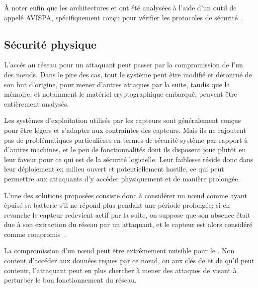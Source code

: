 À noter enfin que les architectures  et  ont été analysées à l'aide d'un outil de  appelé AVISPA, spécifiquement conçu pour vérifier les protocoles de sécurité~\cite{TCCDC09}.

    \subsection{Sécurité physique}

L'accès au réseau pour un attaquant peut passer par la compromission de l'un des nœuds.
Dans le pire des cas, tout le système peut être modifié et détourné de son but d'origine, pour mener d'autres attaques par la suite, tandis que la mémoire, et notamment le matériel cryptographique embarqué, peuvent être entièrement analysés.

Les systèmes d'exploitation utilisés par les capteurs sont généralement conçus pour être légers et s'adapter aux contraintes des capteurs.
Mais ils ne rajoutent pas de problématiques particulières en termes de sécurité système par rapport à d'autres machines, et le peu de fonctionnalités dont ils disposent joue plutôt en leur faveur pour ce qui est de la sécurité logicielle.
Leur faiblesse réside donc dans leur déploiement en milieu ouvert et potentiellement hostile, ce qui peut permettre aux attaquants d'y accéder physiquement et de manière prolongée.

L'une des solutions proposées consiste donc à considérer un nœud comme ayant épuisé sa batterie s'il ne répond plus pendant une période prolongée; si en revanche le capteur redevient actif par la suite, on suppose que son absence était due à son extraction du réseau par un attaquant, et le capteur est alors considéré comme compromis~\cite{Ho10}.

La compromission d'un nœud peut être extrêmement nuisible pour le \rc.
Non content d'accéder aux données reçues par ce nœud, ou aux clés de  et de  qu'il peut contenir, l'attaquant peut en plus chercher à mener des attaques de \dds visant à perturber le bon fonctionnement du réseau.
